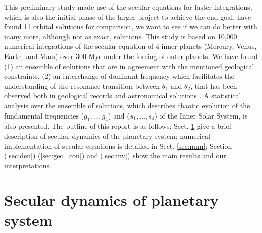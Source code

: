 \documentclass[12pt]{article}
\begin{document}
	This preliminary study made use of the secular equations for faster integrations, which is also the initial phase of the larger project to achieve the end goal. \cite{olsen2019} have found    11 orbital solutions for comparison, we want to see if we can do better with many more, although not as exact, solutions. This study is based on 10,000 numerical integrations of the secular equation of 4 inner planets (Mercury, Venus, Earth, and Mars) over 300 Myr under the forcing of outer planets. We have found (1) an ensemble of solutions that are in agreement with the mentioned geological constraints, (2) an interchange of dominant frequency which facilitates the understanding of the resonance transition between $\theta_1$ and $\theta_2$, that has been observed both in geological records \citep{ma2017} and astronomical solutions \citep{laskar2004}. A statistical analysis over the ensemble of solutions, which describes chaotic evolution of the fundamental frequencies ($g_1, \dots, g_4$) and ($s_1, \dots, s_4$) of the Inner Solar System, is also presented. The outline of this report is as follows: Sect. \ref{sec:dyn} give a brief description of secular dynamics of the planetary system; numerical implementation of secular equations is detailed in Sect. \ref{sec:num}; Section (\ref{sec:den}) (\ref{sec:geo_con}) and (\ref{sec:inv}) show the main results and our interpretations.
	
	\section{Secular dynamics of planetary system} \label{sec:dyn}
\end{document}
